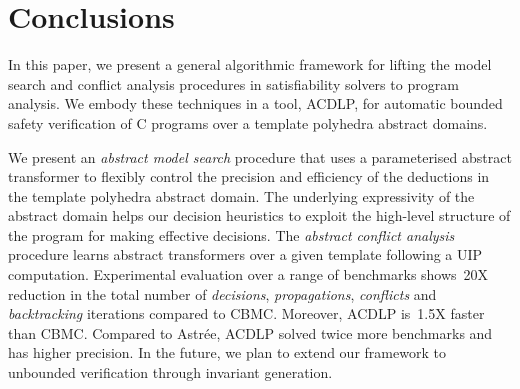 \section{Conclusions}
In this paper, we present a general algorithmic framework for lifting 
the model search and conflict analysis procedures in satisfiability 
solvers to program analysis.  We embody these techniques in a tool, ACDLP,  
for automatic bounded safety verification of C programs over a template 
polyhedra abstract domains.  

We present an {\em abstract model search} procedure that uses a 
parameterised abstract transformer to flexibly control the precision and 
efficiency of the deductions in the template polyhedra abstract domain. 
The underlying expressivity of the abstract domain helps our decision 
heuristics to exploit the high-level structure of the program for making 
effective decisions.  The {\em abstract conflict analysis} procedure learns 
abstract transformers over a given template following a UIP computation.
Experimental evaluation over a range of benchmarks shows~20X
reduction in the total number of {\em decisions}, {\em propagations}, 
{\em conflicts} and {\em backtracking} iterations compared to CBMC.  Moreover, 
ACDLP is~1.5X faster than CBMC.  Compared to Astr{\'e}e, ACDLP solved twice
more benchmarks and has higher precision. In the future, we plan to extend 
our framework to unbounded verification through invariant generation. 


